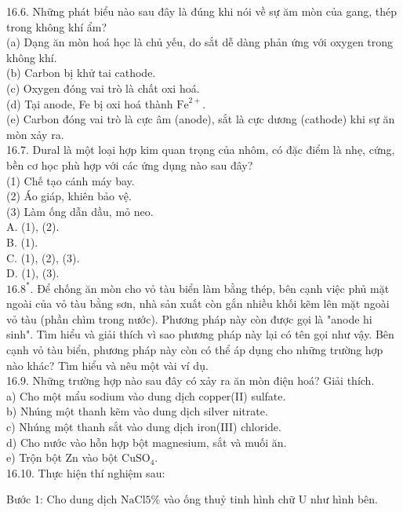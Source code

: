 \documentclass[10pt]{article}
\begin{document}
16.6. Những phát biểu nào sau đây là đúng khi nói về sự ăm mòn của gang, thép trong không khí ẩm?\\
(a) Dạng ăn mòn hoá học là chủ yếu, do sắt dễ dàng phản ứng với oxygen trong không khí.\\
(b) Carbon bị khử tai cathode.\\
(c) Oxygen đóng vai trò là chất oxi hoá.\\
(d) Tại anode, Fe bị oxi hoá thành $\mathrm{Fe}^{2+}$.\\
(e) Carbon đóng vai trò là cực âm (anode), sắt là cực dương (cathode) khi sự ăn mòn xảy ra.\\
16.7. Dural là một loại hợp kim quan trọng của nhôm, có đặc điểm là nhẹ, cứng, bền cơ học phù hợp với các ứng dụng nào sau đây?\\
(1) Chế tạo cánh máy bay.\\
(2) Áo giáp, khiên bảo vệ.\\
(3) Làm ống dẫn dầu, mỏ neo.\\
A. (1), (2).\\
B. (1).\\
C. (1), (2), (3).\\
D. (1), (3).\\
$16.8^{*}$. Để chống ăn mòn cho vỏ tàu biển làm bằng thép, bên cạnh việc phủ mặt ngoài của vỏ tàu bằng sơn, nhà sản xuất còn gắn nhiều khối kẽm lên mặt ngoài vỏ tàu (phần chìm trong nước). Phương pháp này còn được gọi là "anode hi sinh". Tìm hiểu và giải thích vì sao phương pháp này lại có tên gọi như vậy. Bên cạnh vỏ tàu biển, phương pháp này còn có thể áp dụng cho những trường hợp nào khác? Tìm hiểu và nêu một vài ví dụ.\\
16.9. Những trường hợp nào sau đây có xảy ra ăn mòn điện hoá? Giải thích.\\
a) Cho một mẩu sodium vào dung dịch copper(II) sulfate.\\
b) Nhúng một thanh kẽm vào dung dịch silver nitrate.\\
c) Nhúng một thanh sắt vào dung dịch iron(III) chloride.\\
d) Cho nước vào hỗn hợp bột magnesium, sắt và muối ăn.\\
e) Trộn bột Zn vào bột $\mathrm{CuSO}_{4}$.\\
16.10. Thực hiện thí nghiệm sau:

Bước 1: Cho dung dịch $\mathrm{NaCl} 5 \%$ vào ống thuỷ tinh hình chữ U như hình bên.
\end{document}
